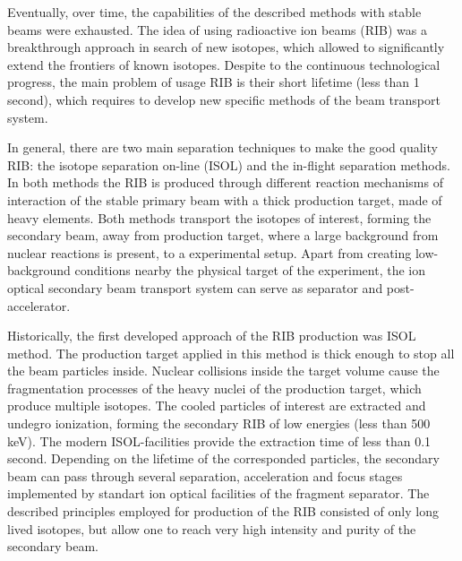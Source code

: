 Eventually, over time, the capabilities of the described methods with stable beams were exhausted.
The idea of using radioactive ion beams (RIB) was a breakthrough approach in search of new isotopes, which allowed to significantly extend the frontiers of known isotopes. 
Despite to the continuous technological progress, the main problem of usage RIB is their short lifetime (less than 1 second), which requires to develop new specific methods of the beam transport system.


In general, there are two main separation techniques to make the good quality RIB: the isotope separation on-line (ISOL) and the in-flight separation methods.
In both methods the RIB is produced through different reaction mechanisms of interaction of the stable primary beam with a thick production target, made of heavy elements.
Both methods transport the isotopes of interest, forming the secondary beam, away from production target, where a large background from nuclear reactions is present, to a experimental setup.
Apart from creating low-background conditions nearby the physical target of the experiment, the ion optical secondary beam transport system can serve as separator and post-accelerator.

Historically, the first developed approach of the RIB production was ISOL method. 
The production target applied in this method is thick enough to stop all the beam particles inside.
Nuclear collisions inside the target volume cause the fragmentation processes of the heavy nuclei of the production target, which produce multiple isotopes.
The cooled particles of interest are extracted and undegro ionization, forming the secondary RIB of low energies (less than 500 keV).
The modern ISOL-facilities provide the extraction time of less than 0.1 second.
Depending on the lifetime of the corresponded particles, the secondary beam can pass through several separation, acceleration and focus stages implemented by standart ion optical facilities of the fragment separator.	
The described principles employed for production of the RIB consisted of only long lived isotopes, but allow one to reach very high intensity and purity of the secondary beam.

